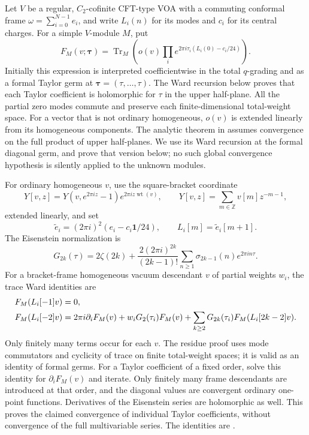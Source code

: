 \documentclass[11pt,a4paper]{article}
\numberwithin{equation}{section}
\theoremstyle{definition}\newtheorem{definition}[theorem]{Definition}
\theoremstyle{remark}\newtheorem{remark}[theorem]{Remark}
\newcommand{\one}{\mathbf1}\newcommand{\B}{\mathcal B}\newcommand{\W}{W_N}
\begin{document}
Let $V$ be a regular, $C_2$-cofinite CFT-type VOA with a commuting conformal frame
$\omega=\sum_{i=0}^{N-1}e_i$, and write $L_i(n)$ for its modes and $c_i$
for its central charges.  For a simple $V$-module $M$, put
\[
 F_M(v;\boldsymbol\tau)=
 \operatorname{Tr}_M\left(o(v)
          \prod_i e^{2\pi i\tau_i(L_i(0)-c_i/24)}\right).
\]
Initially this expression is interpreted coefficientwise in the total
$q$-grading and as a formal Taylor germ at
$\boldsymbol\tau=(\tau,\ldots,\tau)$.  The Ward recursion below
proves that each Taylor coefficient is holomorphic for $\tau$ in the
upper half-plane.  All the partial zero modes commute and preserve
each finite-dimensional total-weight space.  For a vector that is not
ordinary homogeneous, $o(v)$ is extended linearly from its homogeneous
components. The analytic theorem in \cite[Theorem 1]{km}
assumes convergence on the full product of upper half-planes.
We use its Ward recursion at the formal diagonal germ, and prove
that version below; no such global convergence hypothesis is
silently applied to the unknown modules.

For ordinary homogeneous $v$, use the square-bracket coordinate
\[
 Y[v,z]=Y(v,e^{2\pi iz}-1)e^{2\pi iz\operatorname{wt}(v)},
 \qquad Y[v,z]=\sum_{m\in\mathbb Z}v[m]z^{-m-1},
\]
extended linearly, and set
\[
 \widetilde e_i=(2\pi i)^2(e_i-c_i\one/24),\qquad
 L_i[m]=\widetilde e_i[m+1].
\]
The Eisenstein normalization is
\[
 G_{2k}(\tau)=2\zeta(2k)+
 \frac{2(2\pi i)^{2k}}{(2k-1)!}
 \sum_{n\geq1}\sigma_{2k-1}(n)e^{2\pi in\tau}.
\]
For a bracket-frame homogeneous vacuum descendant $v$ of partial
weights $w_i$, the trace Ward identities are
\begin{align}
 F_M(L_i[-1]v)&=0,\notag\\
 F_M(L_i[-2]v)&=2\pi i\partial_iF_M(v)
       +w_iG_2(\tau_i)F_M(v)
       +\sum_{k\ge2}G_{2k}(\tau_i)F_M(L_i[2k-2]v).
 \label{eq:ordinary-ward}
\end{align}
Only finitely many terms occur for each $v$.  The residue proof uses
mode commutators and cyclicity of trace on finite total-weight spaces;
it is valid as an identity of formal germs.  For a Taylor coefficient of a fixed order, solve this identity for
$\partial_iF_M(v)$ and iterate.  Only finitely many frame descendants
are introduced at that order, and the diagonal values are convergent
ordinary one-point functions.  Derivatives of the Eisenstein series
are holomorphic as well.  This proves the claimed convergence of
individual Taylor coefficients, without convergence of the full
multivariable series.  The identities are
\cite[Lemmas 4--5 and equation (2.5)]{km}.
\end{document}

